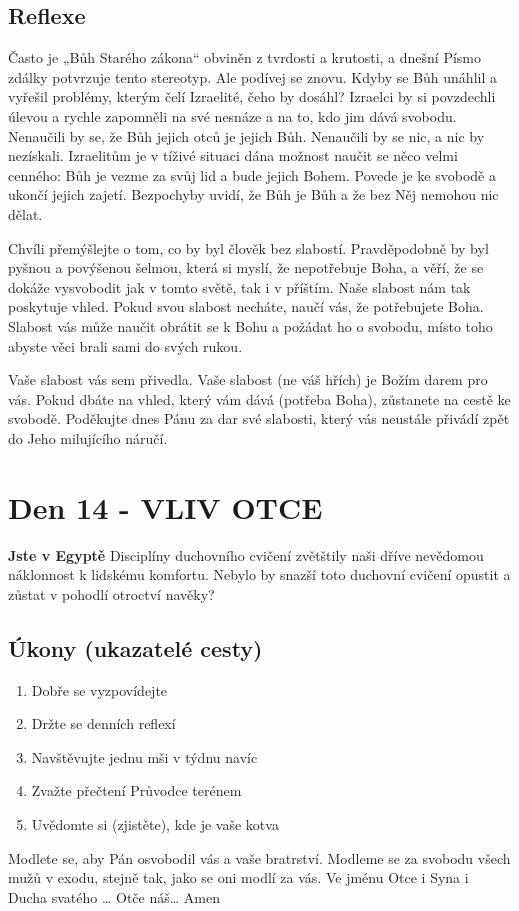 \documentclass[11pt]{article}
\newcommand{\zacatekDruhyTyden}{
  \textbf{Jste v Egyptě} \newline
  Disciplíny duchovního cvičení zvětštily naši dříve nevědomou náklonnost k lidskému komfortu.
  Nebylo by snazší toto duchovní cvičení opustit a zůstat v pohodlí otroctví navěky?

  \subsection*{Úkony (ukazatelé cesty)}
\begin{enumerate}
  \item Dobře se vyzpovídejte
  \item Držte se denních reflexí
  \item Navštěvujte jednu mši v týdnu navíc
  \item Zvažte přečtení Průvodce terénem
  \item Uvědomte si (zjistěte), kde je vaše kotva
\end{enumerate}
Modlete se, aby Pán osvobodil vás a vaše bratrství. \newline
Modleme se za svobodu všech mužů v exodu, stejně tak, jako se oni modlí za vás.\newline
Ve jménu Otce i Syna i Ducha svatého …  Otče náš… Amen
}
\begin{document}
\subsection*{Reflexe}

Často je „Bůh Starého zákona“ obviněn z tvrdosti a krutosti, a dnešní Písmo zdálky potvrzuje tento stereotyp. Ale
podívej se znovu. Kdyby se Bůh unáhlil a vyřešil problémy, kterým čelí Izraelité, čeho by dosáhl? Izraelci by si
povzdechli úlevou a rychle zapomněli na své nesnáze a na to, kdo jim dává svobodu. Nenaučili by se, že Bůh jejich
otců je jejich Bůh. Nenaučili by se nic, a nic by nezískali. Izraelitům je v tíživé situaci dána možnost naučit se něco
velmi cenného: Bůh je vezme za svůj lid a bude jejich Bohem. Povede je ke svobodě a ukončí jejich zajetí.
Bezpochyby uvidí, že Bůh je Bůh a že bez Něj nemohou nic dělat.

Chvíli přemýšlejte o tom, co by byl člověk bez slabostí. Pravděpodobně by byl pyšnou a povýšenou šelmou, která si
myslí, že nepotřebuje Boha, a věří, že se dokáže vysvobodit jak v tomto světě, tak i v příštím. Naše slabost nám tak
poskytuje vhled. Pokud svou slabost necháte, naučí vás, že potřebujete Boha. Slabost vás může naučit obrátit se
k Bohu a požádat ho o svobodu, místo toho abyste věci brali sami do svých rukou.

Vaše slabost vás sem přivedla. Vaše slabost (ne váš hřích) je Božím darem pro vás. Pokud dbáte na vhled, který vám
dává (potřeba Boha), zůstanete na cestě ke svobodě. Poděkujte dnes Pánu za dar své slabosti, který vás neustále
přivádí zpět do Jeho milujícího náručí.

\newpage
\section{Den 14 - VLIV OTCE}
\zacatekDruhyTyden
\end{document}
